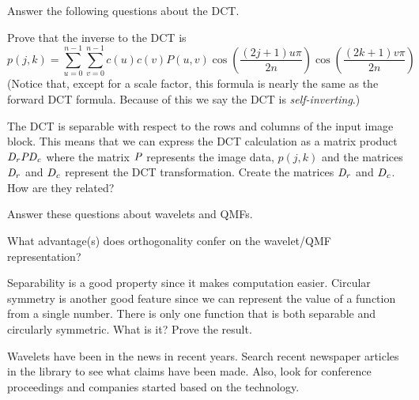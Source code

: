 Answer the following questions about the DCT.

 \be

 \item Prove that the inverse to the DCT is
\begin{equation}
p(j,k) = 
   \sum_{u = 0}^{n-1} \sum_{v=0}^{n-1}  c(u) c(v) P(u,v) 
      \cos ( \frac{(2j + 1) u \pi}{2n} ) \cos ( \frac{ (2k+1)v \pi}{2n} )
\label{e6:dct.inv}
\end{equation}
(Notice that, except for a scale factor, this formula is nearly the
same as the forward DCT formula.  Because of this we say the DCT is
{\em self-inverting}.)

 \item The DCT is separable with respect to the rows and columns of
the input image block.  This means that we can express the DCT
calculation as a matrix product $\it {D_r P D_c}$ where the matrix
$\it P$ represents the image data, $p(j,k)$ and the matrices $\it D_r$
and $\it D_c$ represent the DCT transformation.  Create the matrices
$\it D_r$ and $\it D_c$.  How are they related?

 \ee

\item Answer these questions about wavelets and QMFs.

 \be

  \item What advantage(s) does orthogonality confer on the wavelet/QMF
representation?

  \item Separability is a good property since it makes computation
easier.  Circular symmetry is another good feature since we can
represent the value of a function from a single number.  There is only
one function that is both separable and circularly symmetric.  What is
it?  Prove the result.

%
%
 \ee

 \item Wavelets have been in the news in recent years.  Search recent
newspaper articles in the library to see what claims have been made.
Also, look for conference proceedings and companies started based on
the technology.

\ee

